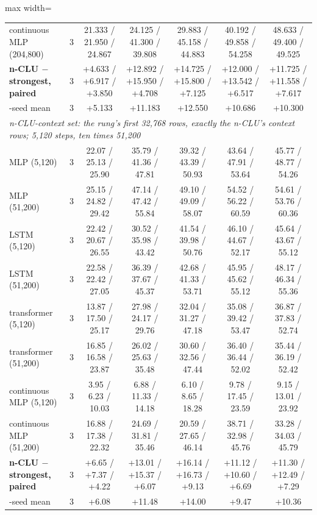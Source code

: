 \documentclass{article} %
\begin{document}
\begin{table}[t]
\begin{adjustbox}{max width=\linewidth}
\begin{tabular}{lcccccc}
continuous MLP (204,800) & 3 & 21.333 / 21.950 / 24.867 & 24.125 / 41.300 / 39.808 & 29.883 / 45.158 / 44.883 & 40.192 / 49.858 / 54.258 & 48.633 / 49.400 / 49.525 \\
\textbf{n-CLU $-$ strongest, paired} & 3 & +4.633 / +6.917 / +3.850 & +12.892 / +15.950 / +4.708 & +14.725 / +15.800 / +7.125 & +12.000 / +13.542 / +6.517 & +11.725 / +11.558 / +7.617 \\
\quad 3-seed mean & 3 & +5.133 & +11.183 & +12.550 & +10.686 & +10.300 \\
\midrule
\multicolumn{7}{l}{\emph{n-CLU-context set: the rung's first 32,768 rows, exactly the n-CLU's context rows; 5,120 steps, ten times 51,200}} \\ %
MLP (5,120) & 3 & 22.07 / 25.13 / 25.90 & 35.79 / 41.36 / 47.81 & 39.32 / 43.39 / 50.93 & 43.64 / 47.91 / 53.64 & 45.77 / 48.77 / 54.26 \\
MLP (51,200) & 3 & 25.15 / 24.82 / 29.42 & 47.14 / 47.42 / 55.84 & 49.10 / 49.09 / 58.07 & 54.52 / 56.22 / 60.59 & 54.61 / 53.76 / 60.36 \\
LSTM (5,120) & 3 & 22.42 / 20.67 / 26.55 & 30.52 / 35.98 / 43.42 & 41.54 / 39.98 / 50.76 & 46.10 / 44.67 / 52.17 & 45.64 / 43.67 / 55.12 \\
LSTM (51,200) & 3 & 22.58 / 22.42 / 27.05 & 36.39 / 37.67 / 45.37 & 42.68 / 41.33 / 53.71 & 45.95 / 45.62 / 55.12 & 48.17 / 46.34 / 55.36 \\
transformer (5,120) & 3 & 13.87 / 17.50 / 25.17 & 27.98 / 24.17 / 29.76 & 32.04 / 31.27 / 47.18 & 35.08 / 39.42 / 53.47 & 36.87 / 37.83 / 52.74 \\
transformer (51,200) & 3 & 16.85 / 16.58 / 23.87 & 26.02 / 25.63 / 35.48 & 30.60 / 32.56 / 47.44 & 36.40 / 36.44 / 52.02 & 35.44 / 36.19 / 52.42 \\
continuous MLP (5,120) & 3 & 3.95 / 6.23 / 10.03 & 6.88 / 11.33 / 14.18 & 6.10 / 8.65 / 18.28 & 9.78 / 17.45 / 23.59 & 9.15 / 13.01 / 23.92 \\
continuous MLP (51,200) & 3 & 16.88 / 17.38 / 22.32 & 24.69 / 31.81 / 35.46 & 20.59 / 27.65 / 46.14 & 38.71 / 32.98 / 45.76 & 33.28 / 34.03 / 45.79 \\
\textbf{n-CLU $-$ strongest, paired} & 3 & +6.65 / +7.37 / +4.22 & +13.01 / +15.37 / +6.07 & +16.14 / +16.73 / +9.13 & +11.12 / +10.60 / +6.69 & +11.30 / +12.49 / +7.29 \\
\quad 3-seed mean & 3 & +6.08 & +11.48 & +14.00 & +9.47 & +10.36 \\
\bottomrule
\end{tabular}\end{adjustbox}
\end{table}
\end{document}
